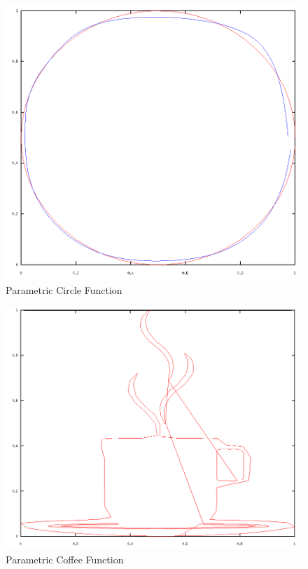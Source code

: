 \documentclass{article}
\begin{document}
\begin{figure}[tb]
	\begin{center}
		\includegraphics[scale=0.5]{img/circle}
	\end{center}
	\caption{Parametric Circle Function}
	\label{fig:circle}
\end{figure}

\begin{figure}[tb]
	\begin{center}
		\includegraphics[scale=0.45]{img/coffee1}
	\end{center}
	\caption{Parametric Coffee Function}
	\label{fig:coffee1}
\end{figure}
\end{document}
